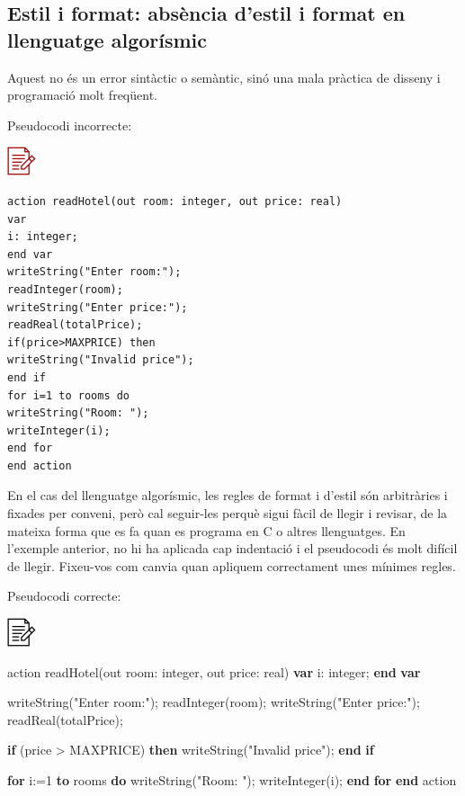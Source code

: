 \documentclass[
]{book}
\newenvironment{Shaded}{\begin{snugshade}}{\end{snugshade}}
\newcommand{\DataTypeTok}[1]{\textcolor[rgb]{0.13,0.29,0.53}{#1}}
\newcommand{\DecValTok}[1]{\textcolor[rgb]{0.00,0.00,0.81}{#1}}
\newcommand{\KeywordTok}[1]{\textcolor[rgb]{0.13,0.29,0.53}{\textbf{#1}}}
\newcommand{\NormalTok}[1]{#1}
\begin{document}
\hypertarget{estil-i-format-absuxe8ncia-destil-i-format-en-llenguatge-algoruxedsmic}{%
\subsection{Estil i format: absència d'estil i format en llenguatge algorísmic}\label{estil-i-format-absuxe8ncia-destil-i-format-en-llenguatge-algoruxedsmic}}

Aquest no és un error sintàctic o semàntic, sinó una mala pràctica de disseny i programació molt freqüent.

Pseudocodi incorrecte:

\includegraphics{./img/alg_err.png}

\begin{verbatim}
action readHotel(out room: integer, out price: real)
var
i: integer;
end var
writeString("Enter room:");
readInteger(room);
writeString("Enter price:");
readReal(totalPrice);
if(price>MAXPRICE) then
writeString("Invalid price");
end if
for i=1 to rooms do
writeString("Room: ");
writeInteger(i);
end for
end action
\end{verbatim}

En el cas del llenguatge algorísmic, les regles de format i d'estil són arbitràries i fixades per conveni, però cal seguir-les perquè sigui fàcil de llegir i revisar, de la mateixa forma que es fa quan es programa en C o altres llenguatges. En l'exemple anterior, no hi ha aplicada cap indentació i el pseudocodi és molt difícil de llegir. Fixeu-vos com canvia quan apliquem correctament unes mínimes regles.

Pseudocodi correcte:

\includegraphics{./img/alg.png}

\begin{Shaded}
\begin{Highlighting}[]
\NormalTok{action readHotel(out room: }\DataTypeTok{integer}\NormalTok{, out price: }\DataTypeTok{real}\NormalTok{)}
    \KeywordTok{var}
\NormalTok{        i: }\DataTypeTok{integer}\NormalTok{;}
    \KeywordTok{end} \KeywordTok{var}
    
\NormalTok{    writeString("Enter room:");}
\NormalTok{    readInteger(room);}
\NormalTok{    writeString("Enter price:");}
\NormalTok{    readReal(totalPrice);}
    
    \KeywordTok{if}\NormalTok{ (price \textgreater{} MAXPRICE) }\KeywordTok{then}
\NormalTok{        writeString("Invalid price");}
    \KeywordTok{end} \KeywordTok{if}
    
    \KeywordTok{for}\NormalTok{ i:=}\DecValTok{1} \KeywordTok{to}\NormalTok{ rooms }\KeywordTok{do}
\NormalTok{        writeString("Room: ");}
\NormalTok{    writeInteger(i);}
    \KeywordTok{end} \KeywordTok{for}
\KeywordTok{end}\NormalTok{ action}
\end{Highlighting}
\end{Shaded}
\end{document}
